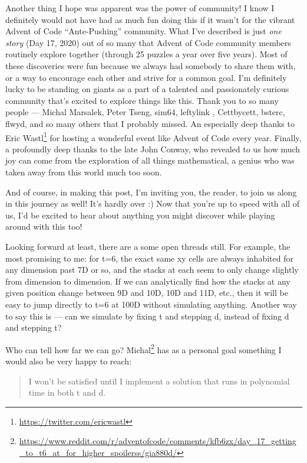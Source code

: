 \documentclass[]{article}
\renewcommand{\href}[2]{#2\footnote{\url{#1}}}
\begin{document}
Another thing I hope was apparent was the power of community! I know I
definitely would not have had as much fun doing this if it wasn't for the
vibrant Advent of Code ``Ante-Pushing'' community. What I've described is just
\emph{one story} (Day 17, 2020) out of so many that Advent of Code community
members routinely explore together (through 25 puzzles a year over five years).
Most of these discoveries were fun because we always had somebody to share them
with, or a way to encourage each other and strive for a common goal. I'm
definitely lucky to be standing on giants as a part of a talented and
passionately curious community that's excited to explore things like this. Thank
you to so many people --- Michal Marsalek, Peter Tseng, sim64, leftylink ,
Cettbycett, bsterc, flwyd, and so many others that I probably missed. An
especially deep thanks to \href{https://twitter.com/ericwastl}{Eric Wastl} for
hosting a wonderful event like Advent of Code every year. Finally, a profoundly
deep thanks to the late John Conway, who revealed to us how much joy can come
from the exploration of all things mathematical, a genius who was taken away
from this world much too soon.

And of course, in making this post, I'm inviting you, the reader, to join us
along in this journey as well! It's hardly over :) Now that you're up to speed
with all of us, I'd be excited to hear about anything you might discover while
playing around with this too!

Looking forward at least, there are a some open threads still. For example, the
most promising to me: for t=6, the exact same xy cells are always inhabited for
any dimension past 7D or so, and the stacks at each seem to only change slightly
from dimension to dimension. If we can analytically find how the stacks at any
given position change between 9D and 10D, 10D and 11D, etc., then it will be
easy to jump directly to t=6 at 100D without simulating anything. Another way to
say this is --- can we simulate by fixing t and stepping d, instead of fixing d
and stepping t?

Who can tell how far we can go?
\href{https://www.reddit.com/r/adventofcode/comments/kfb6zx/day_17_getting_to_t6_at_for_higher_spoilerss/gia880d/}{Michal}
has as a personal goal something I would also be very happy to reach:

\begin{quote}
I won't be satisfied until I implement a solution that runs in polynomial time
in both t and d.
\end{quote}
\end{document}
